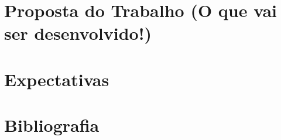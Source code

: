\documentclass[
	12pt,				%
	openright,			%
	oneside,
	a4paper,			%
	english,			%
	french,				%
	spanish,			%
	brazil				%
	]{abntex2}
\begin{document}
\chapter[Proposta do Trabalho]{Proposta do Trabalho (O que vai ser desenvolvido!)}


\chapter[Expectativas]{Expectativas}


\postextual

\chapter[Bibliografia]{Bibliografia}


\end{document}
